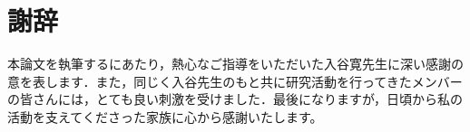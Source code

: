 \section*{謝辞}
本論文を執筆するにあたり，熱心なご指導をいただいた入谷寛先生に深い感謝の意を表します．また，同じく入谷先生のもと共に研究活動を行ってきたメンバーの皆さんには，とても良い刺激を受けました．最後になりますが，日頃から私の活動を支えてくださった家族に心から感謝いたします。